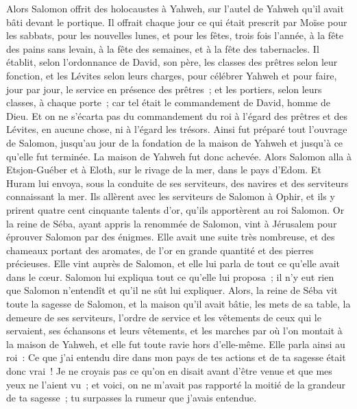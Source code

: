 \begin{multicols}{2}
Alors Salomon offrit des holocaustes à Yahweh, sur l'autel de Yahweh qu'il avait bâti devant le portique.
Il offrait chaque jour ce qui était prescrit par Moïse pour les sabbats, pour les nouvelles lunes, et pour les fêtes, trois fois l'année, à la fête des pains sans levain, à la fête des semaines, et à la fête des tabernacles.
Il établit, selon l'ordonnance de David, son père, les classes des prêtres selon leur fonction, et les Lévites selon leurs charges, pour célébrer Yahweh et pour faire, jour par jour, le service en présence des prêtres~; et les portiers, selon leurs classes, à chaque porte~; car tel était le commandement de David, homme de Dieu.
Et on ne s'écarta pas du commandement du roi à l'égard des prêtres et des Lévites, en aucune chose, ni à l'égard les trésors.
Ainsi fut préparé tout l'ouvrage de Salomon, jusqu'au jour de la fondation de la maison de Yahweh et jusqu'à ce qu'elle fut terminée. La maison de Yahweh fut donc achevée.
Alors Salomon alla à Etsjon-Guéber et à Eloth, sur le rivage de la mer, dans le pays d'Edom.
Et Huram lui envoya, sous la conduite de ses serviteurs, des navires et des serviteurs connaissant la mer. Ils allèrent avec les serviteurs de Salomon à Ophir, et ils y prirent quatre cent cinquante talents d'or, qu'ils apportèrent au roi Salomon.
\VerseOne{}Or la reine de Séba, ayant appris la renommée de Salomon, vint à Jérusalem pour éprouver Salomon par des énigmes. Elle avait une suite très nombreuse, et des chameaux portant des aromates, de l'or en grande quantité et des pierres précieuses. Elle vint auprès de Salomon, et elle lui parla de tout ce qu'elle avait dans le cœur.
Salomon lui expliqua tout ce qu'elle lui proposa~; il n'y eut rien que Salomon n'entendît et qu'il ne sût lui expliquer.
Alors, la reine de Séba vit toute la sagesse de Salomon, et la maison qu'il avait bâtie,
les mets de sa table, la demeure de ses serviteurs, l'ordre de service et les vêtements de ceux qui le servaient, ses échansons et leurs vêtements, et les marches par où l'on montait à la maison de Yahweh, et elle fut toute ravie hors d'elle-même.
Elle parla ainsi au roi~: Ce que j'ai entendu dire dans mon pays de tes actions et de ta sagesse était donc vrai~!
Je ne croyais pas ce qu'on en disait avant d'être venue et que mes yeux ne l'aient vu~; et voici, on ne m'avait pas rapporté la moitié de la grandeur de ta sagesse~; tu surpasses la rumeur que j'avais entendue.

\end{multicols}
